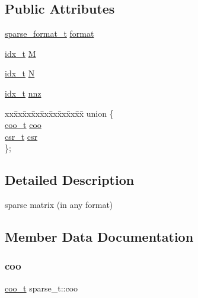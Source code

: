 \subsection*{Public Attributes}
\begin{DoxyCompactItemize}
\item 
\hyperlink{spmv_8cc_a8c0094893526c01b430903b2d9227256}{sparse\+\_\+format\+\_\+t} \hyperlink{structsparse__t_a1bb9e61c965f9ea814aab21f7ff77a73}{format}
\item 
\hyperlink{spmv_8cc_a8e93478a00e685bea5e6a3f617bf03a3}{idx\+\_\+t} \hyperlink{structsparse__t_a8a08bd7a16c76180afccf05e28f72a93}{M}
\item 
\hyperlink{spmv_8cc_a8e93478a00e685bea5e6a3f617bf03a3}{idx\+\_\+t} \hyperlink{structsparse__t_a418c6deef17a60f31ff11182ea94f85a}{N}
\item 
\hyperlink{spmv_8cc_a8e93478a00e685bea5e6a3f617bf03a3}{idx\+\_\+t} \hyperlink{structsparse__t_ae982d138f3904323b65975769b045a3f}{nnz}
\item 
\mbox{\label{structsparse__t_a4d180146ce4a12b0d990cf0e803f7e64}} 
\begin{tabbing}
xx\=xx\=xx\=xx\=xx\=xx\=xx\=xx\=xx\=\kill
union \{\\
\>\hyperlink{structcoo__t}{coo\_t} \hyperlink{structsparse__t_ad0391f2782f49ea2eb248ed255e9d732}{coo}\\
\>\hyperlink{structcsr__t}{csr\_t} \hyperlink{structsparse__t_a68a71613181b0380d0d4d871236b2521}{csr}\\
\}; \\

\end{tabbing}\end{DoxyCompactItemize}


\subsection{Detailed Description}
sparse matrix (in any format) 

\subsection{Member Data Documentation}
\mbox{\label{structsparse__t_ad0391f2782f49ea2eb248ed255e9d732}} 
\subsubsection{\texorpdfstring{coo}{coo}}
{\footnotesize\ttfamily \hyperlink{structcoo__t}{coo\+\_\+t} sparse\+\_\+t\+::coo}

